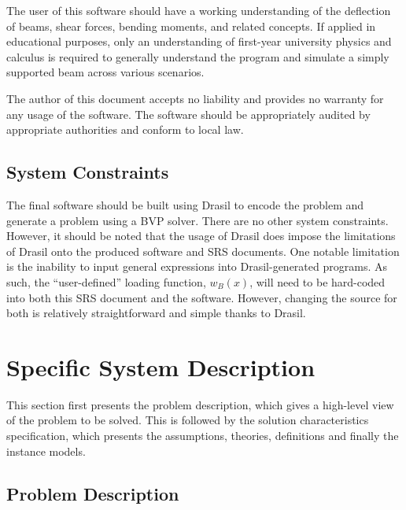 \documentclass[12pt]{article}
\begin{document}
The user of this software should have a working understanding of the deflection
of beams, shear forces, bending moments, and related concepts. If applied in
educational purposes, only an understanding of first-year university physics and
calculus is required to generally understand the program and simulate a simply
supported beam across various scenarios.

The author of this document accepts no liability and provides no warranty for
any usage of the software. The software should be appropriately audited by
appropriate authorities and conform to local law.

\subsection{System Constraints}

The final software should be built using Drasil to encode the problem and
generate a problem using a BVP solver. There are no other system constraints.
However, it should be noted that the usage of Drasil does impose the limitations
of Drasil onto the produced software and SRS documents. One notable limitation
is the inability to input general expressions into Drasil-generated programs. As
such, the ``user-defined'' loading function, \(w_{B}(x)\), will need to be
hard-coded into both this SRS document and the software. However, changing the
source for both is relatively straightforward and simple thanks to Drasil.

\newpage


\section{Specific System Description}
\label{sec_ssd}

This section first presents the problem description, which gives a high-level
view of the problem to be solved.  This is followed by the solution
characteristics specification, which presents the assumptions, theories,
definitions and finally the instance models.

\subsection{Problem Description}
\label{Sec_pd}
\end{document}
